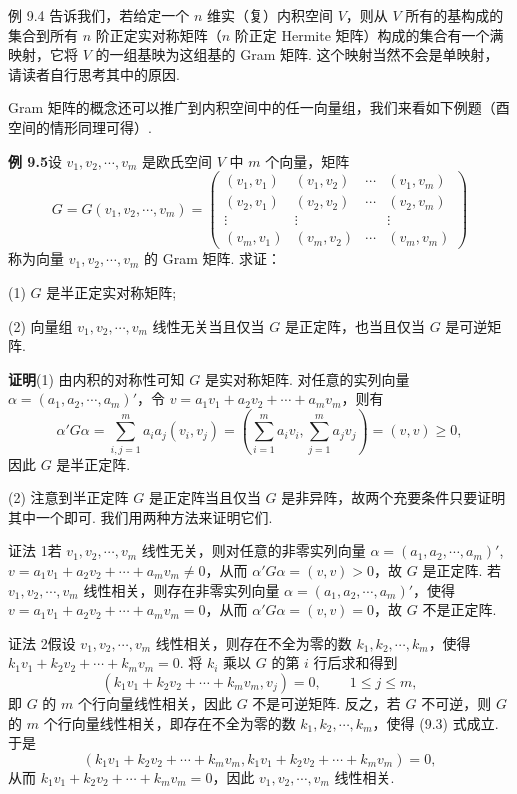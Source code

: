 \documentclass[UTF8, 12pt, fontset=fandol, oneside]{ctexart}
\begin{document}
例 9.4 告诉我们，若给定一个 $n$ 维实（复）内积空间 $V$，则从 $V$ 所有的基构成的集合到所有 $n$ 阶正定实对称矩阵（$n$ 阶正定 Hermite 矩阵）构成的集合有一个满映射，它将 $V$ 的一组基映为这组基的 Gram 矩阵. 这个映射当然不会是单映射，请读者自行思考其中的原因.

Gram 矩阵的概念还可以推广到内积空间中的任一向量组，我们来看如下例题（酉空间的情形同理可得）.

\noindent\textbf{例 9.5}\quad 设 $v_1,v_2,\cdots,v_m$ 是欧氏空间 $V$ 中 $m$ 个向量，矩阵
\[
G=G(v_1,v_2,\cdots,v_m)=
\begin{pmatrix}
(v_1,v_1)&(v_1,v_2)&\cdots&(v_1,v_m)\\
(v_2,v_1)&(v_2,v_2)&\cdots&(v_2,v_m)\\
\vdots&\vdots&&\vdots\\
(v_m,v_1)&(v_m,v_2)&\cdots&(v_m,v_m)
\end{pmatrix}
\]
称为向量 $v_1,v_2,\cdots,v_m$ 的 Gram 矩阵. 求证：

(1) $G$ 是半正定实对称矩阵;

(2) 向量组 $v_1,v_2,\cdots,v_m$ 线性无关当且仅当 $G$ 是正定阵，也当且仅当 $G$ 是可逆矩阵.

\noindent\textbf{证明}\quad (1) 由内积的对称性可知 $G$ 是实对称矩阵. 对任意的实列向量 $\alpha=(a_1,a_2,\cdots,a_m)'$，令 $v=a_1v_1+a_2v_2+\cdots+a_mv_m$，则有
\[
\alpha'G\alpha=\sum_{i,j=1}^m a_ia_j(v_i,v_j)
=\left(\sum_{i=1}^m a_iv_i,\sum_{j=1}^m a_jv_j\right)
=(v,v)\ge 0,
\]
因此 $G$ 是半正定阵.

(2) 注意到半正定阵 $G$ 是正定阵当且仅当 $G$ 是非异阵，故两个充要条件只要证明其中一个即可. 我们用两种方法来证明它们.

证法 1\quad 若 $v_1,v_2,\cdots,v_m$ 线性无关，则对任意的非零实列向量 $\alpha=(a_1,a_2,\cdots,a_m)'$, $v=a_1v_1+a_2v_2+\cdots+a_mv_m\ne 0$，从而 $\alpha'G\alpha=(v,v)>0$，故 $G$ 是正定阵. 若 $v_1,v_2,\cdots,v_m$ 线性相关，则存在非零实列向量 $\alpha=(a_1,a_2,\cdots,a_m)'$，使得 $v=a_1v_1+a_2v_2+\cdots+a_mv_m=0$，从而 $\alpha'G\alpha=(v,v)=0$，故 $G$ 不是正定阵.

证法 2\quad 假设 $v_1,v_2,\cdots,v_m$ 线性相关，则存在不全为零的数 $k_1,k_2,\cdots,k_m$，使得 $k_1v_1+k_2v_2+\cdots+k_mv_m=0$. 将 $k_i$ 乘以 $G$ 的第 $i$ 行后求和得到
\begin{equation}
(k_1v_1+k_2v_2+\cdots+k_mv_m,v_j)=0,\qquad 1\le j\le m,
\tag{9.3}
\end{equation}
即 $G$ 的 $m$ 个行向量线性相关，因此 $G$ 不是可逆矩阵. 反之，若 $G$ 不可逆，则 $G$ 的 $m$ 个行向量线性相关，即存在不全为零的数 $k_1,k_2,\cdots,k_m$，使得 (9.3) 式成立. 于是
\[
(k_1v_1+k_2v_2+\cdots+k_mv_m,k_1v_1+k_2v_2+\cdots+k_mv_m)=0,
\]
从而 $k_1v_1+k_2v_2+\cdots+k_mv_m=0$，因此 $v_1,v_2,\cdots,v_m$ 线性相关.
\end{document}
